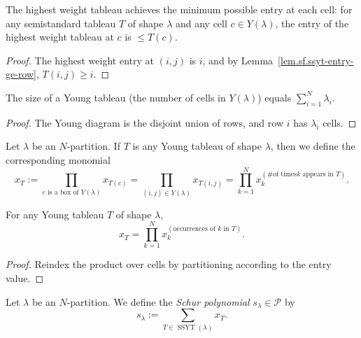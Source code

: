 \begin{lemma}
\label{lem.sf.ssyt-highest-weight-le}
\leanhelper
\leanok
The highest weight tableau achieves the minimum possible entry at each cell:
for any semistandard tableau $T$ of shape $\lambda$ and any cell $c \in Y(\lambda)$,
the entry of the highest weight tableau at $c$ is $\le T(c)$.
\end{lemma}

\begin{proof}
\leanok
The highest weight entry at $(i,j)$ is $i$, and by
Lemma~\ref{lem.sf.ssyt-entry-ge-row}, $T(i,j) \ge i$.
\end{proof}

\begin{lemma}
\label{lem.sf.ytab-size-sum-parts}
\leanhelper
\leanok
The size of a Young tableau (the number of cells in $Y(\lambda)$) equals
$\sum_{i=1}^{N} \lambda_i$.
\end{lemma}

\begin{proof}
\leanok
The Young diagram is the disjoint union of rows, and row $i$ has $\lambda_i$ cells.
\end{proof}

\begin{definition}
\label{def.sf.ytab.xT}
\leantarget
\leanok
Let $\lambda$ be an $N$-partition. If $T$ is any Young
tableau of shape $\lambda$, then we define the corresponding monomial%
\[
x_{T}:=\prod_{c\text{ is a box of }Y\left(  \lambda\right)  }x_{T\left(
c\right)  }=\prod_{\left(  i,j\right)  \in Y\left(  \lambda\right)
}x_{T\left(  i,j\right)  }=\prod_{k=1}^{N}x_{k}^{\left(  \text{\# of times
}k\text{ appears in }T\right)  }.
\]
\end{definition}

\begin{lemma}
\label{lem.sf.ytab-monomial-prod-pow}
\leanhelper
\leanok
For any Young tableau $T$ of shape $\lambda$,
\[
  x_T = \prod_{k=1}^{N} x_k^{(\text{occurrences of } k \text{ in } T)}.
\]
\end{lemma}

\begin{proof}
\leanok
Reindex the product over cells by partitioning according to the entry value.
\end{proof}

\begin{definition}
\label{def.sf.schur}
\leantarget
\leanok
Let $\lambda$ be an $N$-partition. We define the
\emph{Schur polynomial} $s_{\lambda}\in\mathcal{P}$ by%
\[
s_{\lambda}:=\sum_{T\in\operatorname*{SSYT}\left(  \lambda\right)  }x_{T}.
\]
\end{definition}

